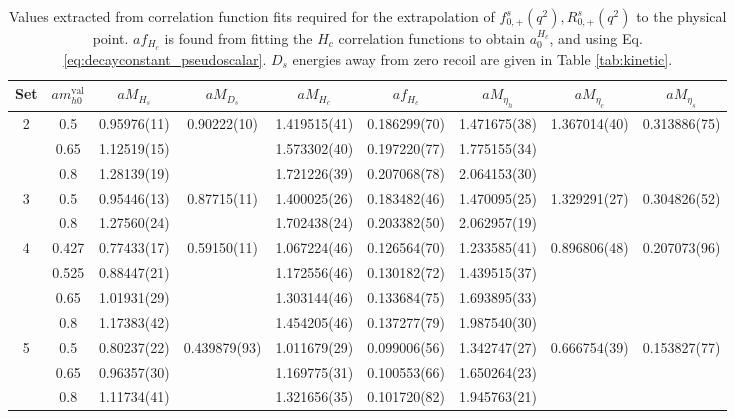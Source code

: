 \begin{table}
  \begin{center}
    \begin{tabular}{ c c c c c c c c c }
      \hline 
      Set & $am_{h0}^{\text{val}}$ & $aM_{H_s}$ & $aM_{D_s}$ &  $aM_{H_c}$ & $af_{H_c}$ & $aM_{\eta_h}$ & $aM_{\eta_c}$ & $aM_{\eta_s}$ \\ [0.5ex]
      \hline 
      2 &0.5 &0.95976(11) &0.90222(10) &1.419515(41) &0.186299(70) &1.471675(38) &1.367014(40) &0.313886(75) \\ [0.5ex] &0.65 &1.12519(15) && 1.573302(40) &0.197220(77) &1.775155(34) &&  \\ [0.5ex] &0.8 &1.28139(19) && 1.721226(39) &0.207068(78) &2.064153(30) &&  \\ [0.5ex]
      \hline 
      3 &0.5 &0.95446(13) &0.87715(11) &1.400025(26) &0.183482(46) &1.470095(25) &1.329291(27) &0.304826(52) \\ [0.5ex] &0.8 &1.27560(24) && 1.702438(24) &0.203382(50) &2.062957(19) &&  \\ [0.5ex]
      \hline 
      4 &0.427 &0.77433(17) &0.59150(11) &1.067224(46) &0.126564(70) &1.233585(41) &0.896806(48) &0.207073(96) \\ [0.5ex] &0.525 &0.88447(21) && 1.172556(46) &0.130182(72) &1.439515(37) &&  \\ [0.5ex] &0.65 &1.01931(29) && 1.303144(46) &0.133684(75) &1.693895(33) &&  \\ [0.5ex] &0.8 &1.17383(42) && 1.454205(46) &0.137277(79) &1.987540(30) &&  \\ [0.5ex]
      \hline 
      5 &0.5 &0.80237(22) &0.439879(93) &1.011679(29) &0.099006(56) &1.342747(27) &0.666754(39) &0.153827(77) \\ [0.5ex] &0.65 &0.96357(30) && 1.169775(31) &0.100553(66) &1.650264(23) &&  \\ [0.5ex] &0.8 &1.11734(41) && 1.321656(35) &0.101720(82) &1.945763(21) &&  \\ [0.5ex]
      \hline
    \end{tabular}
    \caption{Values extracted from correlation function fits required for the extrapolation of $f^s_{0,+}(q^2),R^s_{0,+}(q^2)$ to the physical point. $af_{H_c}$ is found from fitting the $H_c$ correlation functions to obtain $a_0^{H_c}$, and using Eq. \eqref{eq:decayconstant_pseudoscalar}.
      $D_s$ energies away from zero recoil are given in Table \ref{tab:kinetic}. \label{tab:masses}}
  \end{center}
\end{table}


